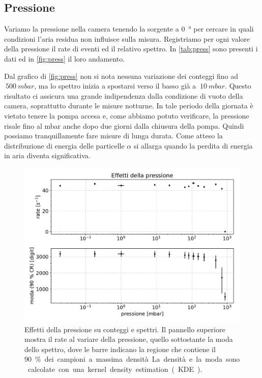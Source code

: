 \subsection{Pressione}

Variamo la pressione nella camera tenendo la sorgente a \SI{0}{\degree} per cercare in quali condizioni l'aria residua non influisce sulla misura.
Registriamo per ogni valore della pressione il rate di eventi ed il relativo spettro. In \autoref{tab:press} sono presenti i dati ed in \autoref{fig:press} il loro andamento.

Dal grafico di \autoref{fig:press} non si nota nessuna variazione dei conteggi fino ad $~\SI{500}{mbar}$,
ma lo spettro inizia a spostarsi verso il basso già a $~\SI{10}{mbar}$.
Questo risultato ci assicura una grande indipendenza dalla condizione di vuoto della camera, soprattutto durante le misure notturne. In tale periodo della giornata è vietato tenere la pompa accesa e, come abbiamo potuto verificare, la pressione risale fino al mbar anche dopo due giorni dalla chiusura della pompa. Quindi possiamo tranquillamente fare misure di lunga durata.
Come atteso la distribuzione di energia delle particelle $\alpha$ si allarga
quando la perdita di energia in aria diventa significativa.

\begin{figure}
\centering
\includegraphics[width=\textwidth]{immagini/press}
\caption{Effetti della pressione su conteggi e spettri.
Il pannello superiore mostra il rate al variare della pressione,
quello sottostante la moda dello spettro,
dove le barre indicano la regione che contiene il \SI{90}\% dei campioni a massima densità.
La densità e la moda sono calcolate con una kernel density estimation (KDE).}
\label{fig:press}
\end{figure}
